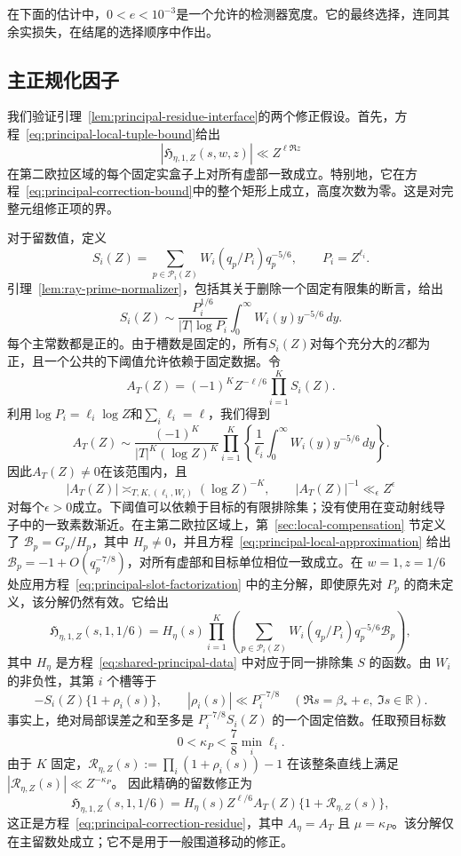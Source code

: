 \documentclass[11pt,a4paper]{article}
\numberwithin{equation}{section}
\numberwithin{figure}{section}
\theoremstyle{definition}
\theoremstyle{remark}
\begin{document}
在下面的估计中，\(0<e<10^{-3}\)是一个允许的检测器宽度。它的最终选择，连同其余实损失，在结尾的选择顺序中作出。

\subsection{主正规化因子}\label{sec:principal-signal}

我们验证引理~\ref{lem:principal-residue-interface}的两个修正假设。首先，方程~\eqref{eq:principal-local-tuple-bound}给出
\[
 |\mathfrak H_{\eta,1,Z}(s,w,z)|\ll Z^{\ell\Re z}
\]
在第二欧拉区域的每个固定实盒子上对所有虚部一致成立。特别地，它在方程~\eqref{eq:principal-correction-bound}中的整个矩形上成立，高度次数为零。这是对完整元组修正项的界。

对于留数值，定义
\[
 S_i(Z)=\sum_{p\in\mathcal P_i(Z)}W_i(q_p/P_i)q_p^{-5/6},
 \qquad P_i=Z^{\ell_i}.
\]
引理~\ref{lem:ray-prime-normalizer}，包括其关于删除一个固定有限集的断言，给出
\[
 S_i(Z)\sim\frac{P_i^{1/6}}{|T|\log P_i}
       \int_0^\infty W_i(y)y^{-5/6}\,dy.
\]
每个主常数都是正的。由于槽数是固定的，所有\(S_i(Z)\)对每个充分大的\(Z\)都为正，且一个公共的下阈值允许依赖于固定数据。令
\begin{equation}\label{eq:principal-scalar}
 A_T(Z)=(-1)^K Z^{-\ell/6}\prod_{i=1}^K S_i(Z).
\end{equation}
利用\(\log P_i=\ell_i\log Z\)和\(\sum_i\ell_i=\ell\)，我们得到
\[
 A_T(Z)\sim
 \frac{(-1)^K}{|T|^K(\log Z)^K}
 \prod_{i=1}^K\left\{\frac1{\ell_i}
       \int_0^\infty W_i(y)y^{-5/6}\,dy\right\}.
\]
因此\(A_T(Z)\ne0\)在该范围内，且
\[
 |A_T(Z)|\asymp_{T,K,(\ell_i,W_i)}(\log Z)^{-K},
 \qquad |A_T(Z)|^{-1}\ll_\epsilon Z^\epsilon
\]
对每个\(\epsilon>0\)成立。下阈值可以依赖于目标的有限排除集；没有使用在变动射线导子中的一致素数渐近。在主第二欧拉区域上，第~\ref{sec:local-compensation} 节定义了 \(\mathcal B_p=G_p/H_p\)，其中 \(H_p\ne0\)，并且方程~\eqref{eq:principal-local-approximation} 给出
\(\mathcal B_p=-1+O(q_p^{-7/8})\)，对所有虚部和目标单位相位一致成立。在 \(w=1,z=1/6\) 处应用方程~\eqref{eq:principal-slot-factorization} 中的主分解，即使原先对 \(P_p\) 的商未定义，该分解仍然有效。它给出
\[
 \mathfrak H_{\eta,1,Z}(s,1,1/6)
 =H_\eta(s)\prod_{i=1}^K
       \left(\sum_{p\in\mathcal P_i(Z)}
           W_i(q_p/P_i)q_p^{-5/6}\mathcal B_p\right),
\]
其中 \(H_\eta\) 是方程~\eqref{eq:shared-principal-data} 中对应于同一排除集 \(S\) 的函数。由 \(W_i\) 的非负性，其第 \(i\) 个槽等于
\[
 -S_i(Z)\{1+\rho_i(s)\},\qquad
 |\rho_i(s)|\ll P_i^{-7/8}
 \quad(\Re s=\beta_*+e,\ \Im s\in\mathbb R).
\]
事实上，绝对局部误差之和至多是 \(P_i^{-7/8}S_i(Z)\) 的一个固定倍数。任取预目标数
\[
 0<\kappa_P<\frac78\min_i\ell_i.
\]
由于 \(K\) 固定，\(\mathcal R_{\eta,Z}(s):=\prod_i(1+\rho_i(s))-1\)
在该整条直线上满足 \(|\mathcal R_{\eta,Z}(s)|\ll Z^{-\kappa_P}\)。
因此精确的留数修正为
\[
 \mathfrak H_{\eta,1,Z}(s,1,1/6)
 =H_\eta(s)Z^{\ell/6}A_T(Z)\{1+\mathcal R_{\eta,Z}(s)\},
\]
这正是方程~\eqref{eq:principal-correction-residue}，其中
\(A_\eta=A_T\) 且 \(\mu=\kappa_P\)。该分解仅在主留数处成立；它不是用于一般围道移动的修正。
\end{document}
